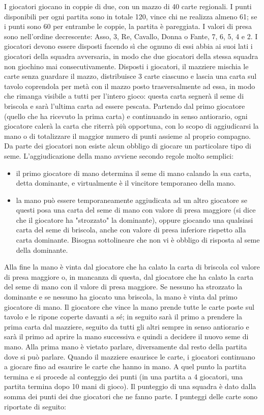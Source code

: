 \documentclass[a4paper,12pt]{article}
\begin{document}
I giocatori giocano in coppie di due, con un mazzo di 40 carte regionali. I punti disponibili per ogni partita sono in totale 120, vince chi ne realizza almeno 61; se i punti sono 60 per entrambe le coppie, la partita è pareggiata. I valori di presa sono nell'ordine decrescente: Asso, 3, Re, Cavallo, Donna o Fante, 7, 6, 5, 4 e 2. I giocatori devono essere disposti facendo sì che ognuno di essi abbia ai suoi lati i giocatori della squadra avversaria, in modo che due giocatori della stessa squadra non giochino mai consecutivamente. Disposti i giocatori, il mazziere mischia le carte senza guardare il mazzo, distribuisce 3 carte ciascuno e lascia una carta sul tavolo coprendola per metà con il mazzo posto trasversalmente ad essa, in modo che rimanga visibile a tutti per l'intero gioco: questa carta segnerà il seme di briscola e sarà l'ultima carta ad essere pescata. Partendo dal primo giocatore (quello che ha ricevuto la prima carta) e continuando in senso antiorario, ogni giocatore calerà la carta che riterrà più opportuna, con lo scopo di aggiudicarsi la mano o di totalizzare il maggior numero di punti assieme al proprio compagno. Da parte dei giocatori non esiste alcun obbligo di giocare un particolare tipo di seme. L'aggiudicazione della mano avviene secondo regole molto semplici:
\begin{itemize}
	\item il primo giocatore di mano determina il seme di mano calando la sua carta, detta dominante, e virtualmente è il vincitore temporaneo della mano.
	\item la mano può essere temporaneamente aggiudicata ad un altro giocatore se questi posa una carta del seme di mano con valore di presa maggiore (si dice che il giocatore ha "strozzato" la dominante), oppure giocando una qualsiasi carta del seme di briscola, anche con valore di presa inferiore rispetto alla carta dominante. Bisogna sottolineare che non vi è obbligo di risposta al seme della dominante.
\end{itemize}
Alla fine la mano è vinta dal giocatore che ha calato la carta di briscola col valore di presa maggiore o, in mancanza di questa, dal giocatore che ha calato la carta del seme di mano con il valore di presa maggiore. Se nessuno ha strozzato la dominante e se nessuno ha giocato una briscola, la mano è vinta dal primo giocatore di mano. Il giocatore che vince la mano prende tutte le carte poste sul tavolo e le ripone coperte davanti a sé; in seguito sarà il primo a prendere la prima carta dal mazziere, seguito da tutti gli altri sempre in senso antiorario e sarà il primo ad aprire la mano successiva e quindi a decidere il nuovo seme di mano. Alla prima mano è vietato parlare, diversamente dal resto della partita dove si può parlare. Quando il mazziere esaurisce le carte, i giocatori continuano a giocare fino ad esaurire le carte che hanno in mano. A quel punto la partita termina e si procede al conteggio dei punti (in una partita a 4 giocatori, una partita termina dopo 10 mani di gioco). Il punteggio di una squadra è dato dalla somma dei punti dei due giocatori che ne fanno parte. I punteggi delle carte sono riportate di seguito:
\end{document}
